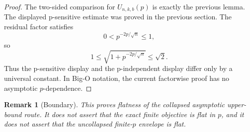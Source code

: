 \documentclass[11pt]{article}
\newtheorem{remark}[theorem]{Remark}
\begin{document}
\begin{proof}
The two-sided comparison for \(U_{n,k,b}(p)\) is exactly the previous lemma.
The displayed p-sensitive estimate was proved in the previous section.
The residual factor satisfies
\[
    0 < p^{-2p/\sqrt n}\le1,
\]
so
\[
    1
    \le
    \sqrt{1+p^{-2p/\sqrt n}}
    \le
    \sqrt2.
\]
Thus the p-sensitive display and the p-independent display differ only by a universal constant.
In Big-O notation, the current factorwise proof has no asymptotic \(p\)-dependence.
\end{proof}

\begin{remark}[Boundary]
This proves flatness of the collapsed asymptotic upper-bound route.
It does not assert that the exact finite objective is flat in \(p\), and it does not assert that the uncollapsed finite-\(p\) envelope is flat.
\end{remark}
\end{document}
